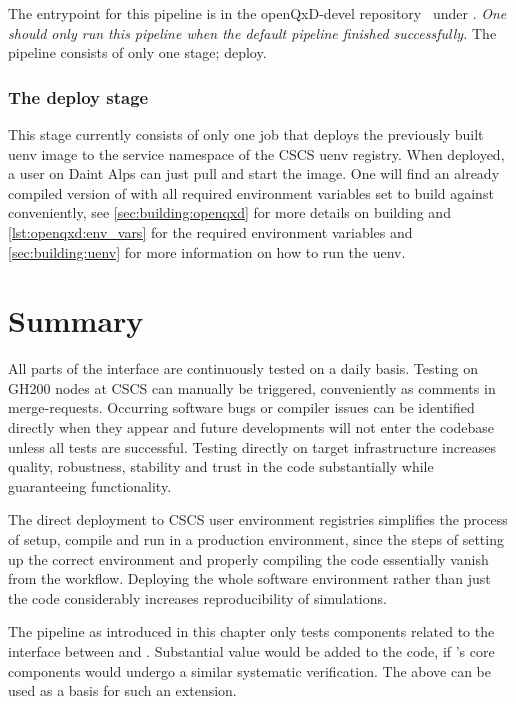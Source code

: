 The entrypoint for this pipeline is in the openQxD-devel repository~\cite{gitlab:openqxd-devel} under .
\emph{One should only run this pipeline when the default pipeline finished successfully.}
The pipeline consists of only one stage; deploy.

\subsubsection{The deploy stage}

This stage currently consists of only one job that deploys the previously built uenv image to the service namespace of the CSCS uenv registry.
When deployed, a user on Daint Alps can just pull and start the image.
One will find an already compiled version of \quda with all required environment variables set to build \openqxd against \quda conveniently, see \cref{sec:building:openqxd} for more details on building \openqxd and \cref{lst:openqxd:env_vars} for the required environment variables and \cref{sec:building:uenv} for more information on how to run the uenv.

\section{Summary}
\label{sec:cicd:summary}

All parts of the interface are continuously tested on a daily basis.
Testing on GH200 nodes at CSCS can manually be triggered, conveniently as comments in merge-requests.
Occurring software bugs or compiler issues can be identified directly when they appear and future developments will not enter the codebase unless all tests are successful.
Testing directly on target infrastructure increases quality, robustness, stability and trust in the code substantially while guaranteeing functionality.

The direct deployment to CSCS user environment registries simplifies the process of setup, compile and run in a production environment, since the steps of setting up the correct environment and properly compiling the code essentially vanish from the workflow.
Deploying the whole software environment rather than just the code considerably increases reproducibility of simulations.

The pipeline as introduced in this chapter only tests components related to the interface between \openqxd and \quda.
Substantial value would be added to the code, if \openqxd's core components would undergo a similar systematic verification.
The above can be used as a basis for such an extension.

